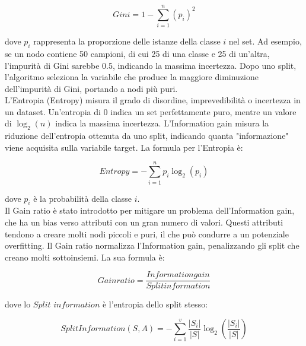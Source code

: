 \documentclass[a4paper,12pt]{report}
\begin{document}
	$$Gini = 1 - \sum_{i=1}^{n} (p_i)^2$$
	
	dove $p_i$ rappresenta la proporzione delle istanze della classe $i$ nel set. Ad esempio, se un nodo contiene 50 campioni, di cui 25 di una classe e 25 di un'altra, l'impurità di Gini sarebbe 0.5, indicando la massima incertezza. Dopo uno split, l'algoritmo seleziona la variabile che produce la maggiore diminuzione dell'impurità di Gini, portando a nodi più puri. \\
	L'Entropia (Entropy) misura il grado di disordine, imprevedibilità o incertezza in un dataset. Un'entropia di 0 indica un set perfettamente puro, mentre un valore di $\log_2(n)$ indica la massima incertezza. L'Information gain misura la riduzione dell'entropia ottenuta da uno split, indicando quanta "informazione" viene acquisita sulla variabile target. La formula per l'Entropia è:
	
	$$Entropy = - \sum_{i=1}^{n} p_i \log_2(p_i)$$
	
	dove $p_i$ è la probabilità della classe $i$. \\
	Il Gain ratio è stato introdotto per mitigare un problema dell'Information gain, che ha un bias verso attributi con un gran numero di valori. Questi attributi tendono a creare molti nodi piccoli e puri, il che può condurre a un potenziale overfitting. Il Gain ratio normalizza l'Information gain, penalizzando gli split che creano molti sottoinsiemi. La sua formula è:
	
	$$Gain ratio = \frac{Information gain}{Split information}$$
	
	dove lo $Split$ $information$ è l'entropia dello split stesso:
	
	$$Split Information(S, A) = - \sum_{i=1}^{v} \frac{|S_i|}{|S|} \log_2(\frac{|S_i|}{|S|})$$
	
\end{document}
